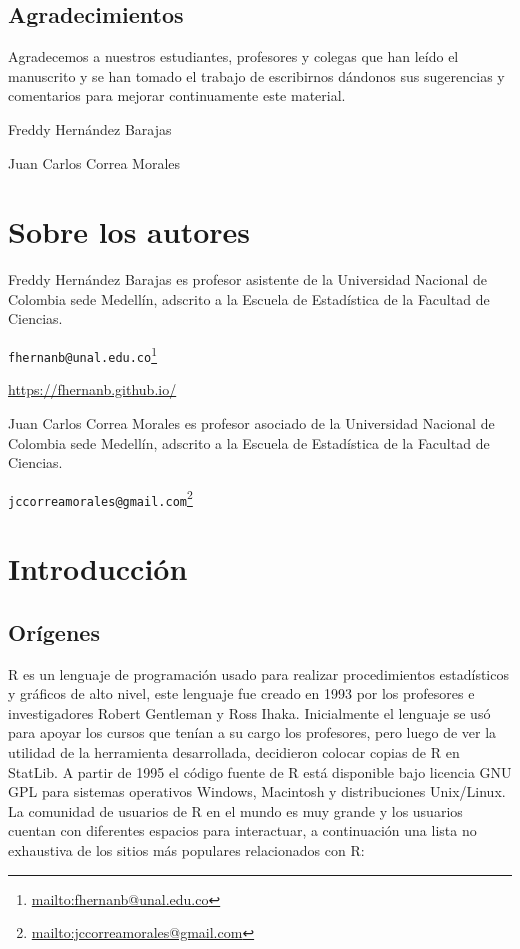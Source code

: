 \documentclass[10pt,]{krantz}
\let\proglang=\textsf
\renewcommand{\href}[2]{#2\footnote{\url{#1}}}
\let\BeginKnitrBlock\begin \let\EndKnitrBlock\end
\begin{document}
\section*{Agradecimientos}\label{agradecimientos}


Agradecemos a nuestros estudiantes, profesores y colegas que han leído
el manuscrito y se han tomado el trabajo de escribirnos dándonos sus
sugerencias y comentarios para mejorar continuamente este material.

\BeginKnitrBlock{flushright}
Freddy Hernández Barajas

Juan Carlos Correa Morales
\EndKnitrBlock{flushright}

\chapter*{Sobre los autores}\label{sobre-los-autores}


Freddy Hernández Barajas es profesor asistente de la Universidad
Nacional de Colombia sede Medellín, adscrito a la Escuela de Estadística
de la Facultad de Ciencias.

\href{mailto:fhernanb@unal.edu.co}{\nolinkurl{fhernanb@unal.edu.co}}

\url{https://fhernanb.github.io/}

\vspace{1cm}

Juan Carlos Correa Morales es profesor asociado de la Universidad
Nacional de Colombia sede Medellín, adscrito a la Escuela de Estadística
de la Facultad de Ciencias.

\href{mailto:jccorreamorales@gmail.com}{\nolinkurl{jccorreamorales@gmail.com}}

\mainmatter

\chapter{\texorpdfstring{Introducción
\label{intro}}{Introducción }}\label{introduccion}

\section{Orígenes} \label{sec:origenes}

\proglang{R} es un lenguaje de programación usado para realizar
procedimientos estadísticos y gráficos de alto nivel, este lenguaje fue
creado en 1993 por los profesores e investigadores Robert Gentleman y
Ross Ihaka. Inicialmente el lenguaje se usó para apoyar los cursos que
tenían a su cargo los profesores, pero luego de ver la utilidad de la
herramienta desarrollada, decidieron colocar copias de \proglang{R} en
StatLib. A partir de 1995 el código fuente de \proglang{R} está
disponible bajo licencia GNU GPL para sistemas operativos Windows,
Macintosh y distribuciones Unix/Linux. La comunidad de usuarios de
\proglang{R} en el mundo es muy grande y los usuarios cuentan con
diferentes espacios para interactuar, a continuación una lista no
exhaustiva de los sitios más populares relacionados con \proglang{R}:
\end{document}
